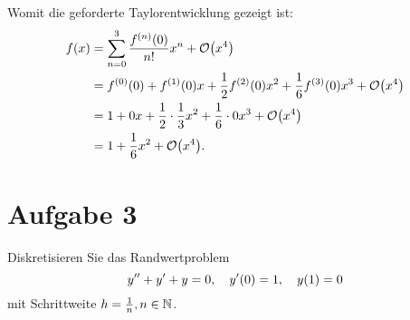 \documentclass{exercise}
\begin{document}
    Womit die geforderte Taylorentwicklung gezeigt ist:
    \begin{align*}
        f\parentheses*{x} &= \sum_{n = 0}^3\frac{f^{\parentheses*{n}}\parentheses*{0}}{n!}x^n + \mathcal{O}\parentheses*{x^4}\\
        &= f^{\parentheses*{0}}\parentheses*{0} + f^{\parentheses*{1}}\parentheses*{0}x + \frac{1}{2}f^{\parentheses*{2}}\parentheses*{0}x^2 + \frac{1}{6}f^{\parentheses*{3}}\parentheses*{0}x^3 + \mathcal{O}\parentheses*{x^4}\\
        &= 1 + 0x + \frac{1}{2} \cdot \frac{1}{3}x^2 + \frac{1}{6} \cdot 0x^3 + \mathcal{O}\parentheses*{x^4}\\
        &= 1 + \frac{1}{6}x^2 + \mathcal{O}\parentheses*{x^4}.
    \end{align*}


    \section*{Aufgabe 3}

    \begin{problem}
        Diskretisieren Sie das Randwertproblem
        \[
            y'' + y' + y = 0, \quad y'\parentheses*{0} = 1, \quad y\parentheses*{1} = 0
        \]
        mit Schrittweite \(h = \frac{1}{n}, n \in \mathbb{N}\).
    \end{problem}
\end{document}
